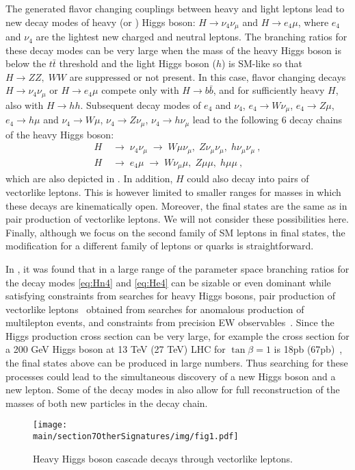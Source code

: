 The generated flavor changing couplings between heavy and light leptons lead to new decay modes of heavy \cpeven (or \cpodd) Higgs boson: $H \to \nu_4 \nu_\mu$ and $H \to e_4 \mu$, where $e_4$ and $\nu_4$ are the  lightest new charged and neutral leptons. The branching ratios for these decay modes can be very large when the mass of  the heavy Higgs boson is below the $t \bar t$ threshold and the light Higgs boson ($h$) is SM-like so that $H \to ZZ,\; WW$ are suppressed or not present. In this case, flavor changing decays $H \to \nu_4 \nu_\mu$ or $H \to e_4 \mu$ compete only with $H\to b \bar b$,  and for sufficiently heavy $H$, also with $H \to hh$. 
Subsequent decay modes of $e_4$ and $\nu_4$, $e_4 \to W  \nu_\mu$, $e_4 \to Z \mu$,  $e_4 \to h \mu$ and $\nu_4 \to W \mu$, $\nu_4 \to Z \nu_\mu$, $\nu_4 \to h \nu_\mu$ lead to the following 6 decay chains of the heavy Higgs boson:
%
\begin{align}
H &\; \to \; \nu_4 \nu_\mu \; \to \; W\mu \nu_\mu, \; Z\nu_\mu \nu_\mu,\; h \nu_\mu \nu_\mu~, \label{eq:Hn4} \\  
H &\; \to \; e_4 \mu \; \to \; W\nu_\mu \mu, \; Z\mu\mu,\; h \mu\mu~, \label{eq:He4}
\end{align}
%
 which are also depicted in . In addition, $H$ could also decay into pairs of vectorlike leptons. This is however  limited to smaller ranges for masses in which these decays are kinematically open. Moreover, the final states are the same as in pair production of vectorlike leptons. We will not consider these possibilities here. Finally, although we  focus on the second family of SM leptons in final states, the modification for a different family of leptons or quarks is straightforward.


In , it was found that in a large range of the parameter space branching ratios for the decay modes \eqref{eq:Hn4} and \eqref{eq:He4} can be sizable  or even dominant while satisfying constraints from searches for heavy Higgs bosons,  pair production of  vectorlike leptons~\cite{Dermisek:2014qca} obtained from searches for anomalous production of multilepton events, and  constraints from precision EW observables~\cite{Patrignani:2016xqp}.
Since the Higgs production cross section can be very large, for example the cross section for a 200 GeV Higgs boson at 13 TeV (27 TeV)  LHC for $\tan \beta =1$ is 18pb (67pb)~\cite{Heinemeyer:2013tqa,Harlander:2012pb,Harlander:2016hcx}, the final states above can be produced in large numbers. Thus searching for these processes could  lead to the simultaneous discovery of a new Higgs boson and a new lepton. Some of the decay modes in  also allow for full reconstruction of the masses of both new particles in the decay chain.
%
\begin{figure}
\begin{center}
%
\texttt{[image: \\main/section7OtherSignatures/img/fig1.pdf]}
%
\caption{Heavy Higgs boson cascade decays through vectorlike leptons.
\label{fig:topologies}
}
\end{center}
\end{figure}
%



